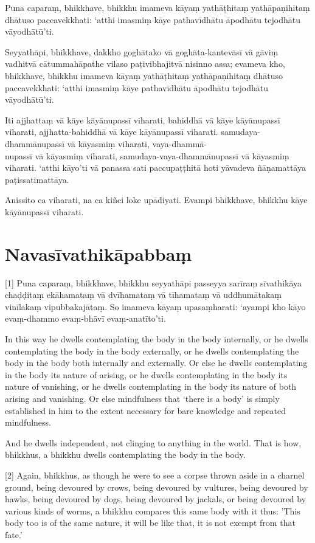 Puna caparaṃ, bhikkhave, bhikkhu imameva kāyaṃ yathāṭhitaṃ yathāpaṇihitaṃ dhātuso
paccavekkhati: ‘atthi imasmiṃ kāye pathavīdhātu āpodhātu tejodhātu vāyodhātū’ti.

Seyyathāpi, bhikkhave, dakkho goghātako vā goghāta-kantevāsī vā gāviṃ vadhitvā
cātummahāpathe vilaso paṭivibhajitvā nisinno assa; evameva kho, bhikkhave, bhikkhu
imameva kāyaṃ yathāṭhitaṃ yathāpaṇihitaṃ dhātuso paccavekkhati: ‘atthi imasmiṃ
kāye pathavīdhātu āpodhātu tejodhātu vāyodhātū’ti.

Iti ajjhattaṃ vā kāye kāyānupassī viharati, bahiddhā vā kāye kāyānupassī
viharati, ajjhatta-bahiddhā vā kāye kāyānupassī viharati. samudaya-dhammānupassī
vā kāyasmiṃ viharati, vaya-dhammā-\\
nupassī vā kāyasmiṃ viharati, samudaya-vaya-dhammānupassī vā kāyasmiṃ viharati.
‘atthi kāyo’ti vā panassa sati paccupaṭṭhitā hoti yāvadeva ñāṇamattāya
paṭissatimattāya.

Anissito ca viharati, na ca kiñci loke upādiyati. Evampi bhikkhave, bhikkhu kāye
kāyānupassī viharati.


\section*{Navasīvathikāpabbaṃ}

[1] Puna caparaṃ, bhikkhave, bhikkhu seyyathāpi passeyya sarīraṃ sīvathikāya chaḍḍitaṃ
ekāhamataṃ vā dvīhamataṃ vā tīhamataṃ vā uddhumātakaṃ vinīlakaṃ vipubbakajātaṃ.
So imameva kāyaṃ upasaṃharati: ‘ayampi kho kāyo evaṃ-dhammo evaṃ-bhāvī
evaṃ-anatīto’ti.

\englishPage

In this way he dwells contemplating the body in the body internally, or he
dwells contemplating the body in the body externally, or he dwells contemplating
the body in the body both internally and externally. Or else he dwells
contemplating in the body its nature of arising, or he dwells contemplating in
the body its nature of vanishing, or he dwells contemplating in the body its
nature of both arising and vanishing. Or else mindfulness that ‘there is a body’
is simply established in him to the extent necessary for bare knowledge and
repeated mindfulness.

And he dwells independent, not clinging to anything in the world. That is how,
bhikkhus, a bhikkhu dwells contemplating the body in the body.

[2] Again, bhikkhus, as though he were to see a corpse thrown aside in a charnel
ground, being devoured by crows, being devoured by vultures, being devoured by
hawks, being devoured by dogs, being devoured by jackals, or being devoured by
various kinds of worms, a bhikkhu compares this same body with it thus: 'This
body too is of the same nature, it will be like that, it is not exempt from that
fate.'

